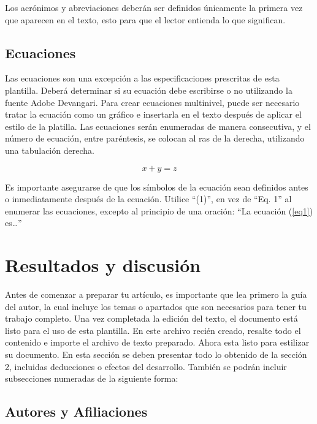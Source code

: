     Los acrónimos y abreviaciones deberán ser definidos únicamente la primera vez que aparecen en el texto, esto para que el lector entienda lo que significan.
    
    \subsection{Ecuaciones}
    
    Las ecuaciones son una excepción a las especificaciones prescritas de esta plantilla. 
    Deberá determinar si su ecuación debe escribirse o no utilizando la fuente Adobe Devangari. 
    Para crear ecuaciones multinivel, puede ser necesario tratar la ecuación como un gráfico e insertarla en el texto después de aplicar el estilo de la platilla.
    Las ecuaciones serán enumeradas de manera consecutiva, y el número de ecuación, entre paréntesis, se colocan al ras de la derecha, utilizando una tabulación derecha. 
    
    \begin{equation}
        \label{eq1}
        x + y = z 
    \end{equation}
    
    Es importante asegurarse de que los símbolos de la ecuación sean definidos antes o inmediatamente después de la ecuación. Utilice “(1)”, en vez de “Eq. 1” al enumerar las ecuaciones, excepto al principio de una oración: “La ecuación (\ref{eq1}) es…”
    
    \section{Resultados y discusión}
    
    Antes de comenzar a preparar tu artículo, es importante que lea primero la guía del autor, la cual incluye los temas o apartados que son necesarios para tener tu trabajo completo.
    Una vez completada la edición del texto, el documento está listo para el uso de esta plantilla. En este archivo recién creado, resalte todo el contenido e importe el archivo de texto preparado. Ahora esta listo para estilizar su documento.
    En esta sección se deben presentar todo lo obtenido de la sección 2, incluidas deducciones o efectos del desarrollo. También se podrán incluir subsecciones numeradas de la siguiente forma:
    
    \subsection{Autores y Afiliaciones}
    
